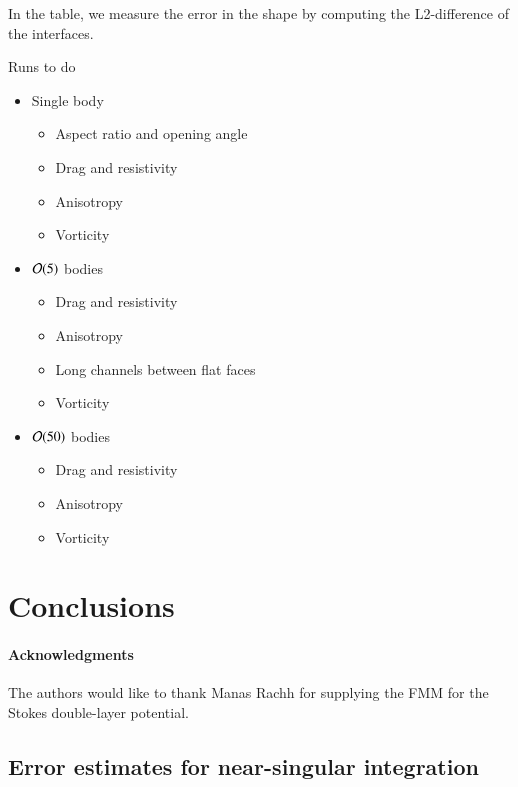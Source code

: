 \documentclass[preprint, 10pt]{elsarticle}
\begin{document}
In the table, we measure the error in the shape by computing the L2-difference of the interfaces.



\newpage


Runs to do
\begin{itemize}
  \item Single body
  \begin{itemize}
    \item Aspect ratio and opening angle
    \item Drag and resistivity
    \item Anisotropy
    \item Vorticity
  \end{itemize}
  \item ${\mathcal{O}}(5)$ bodies
  \begin{itemize}
    \item Drag and resistivity
    \item Anisotropy
    \item Long channels between flat faces
    \item Vorticity
  \end{itemize}
  \item ${\mathcal{O}}(50)$ bodies
  \begin{itemize}
    \item Drag and resistivity
    \item Anisotropy
    \item Vorticity
  \end{itemize}
\end{itemize}


\section{Conclusions\label{s:conclusions}}


\paragraph{\bf Acknowledgments} The authors would like to thank Manas
Rachh for supplying the FMM for the Stokes double-layer potential.


\begin{appendices}
\section{Error estimates for near-singular integration \label{A:AppendixA}} 
\end{appendices}


 

\end{document}
